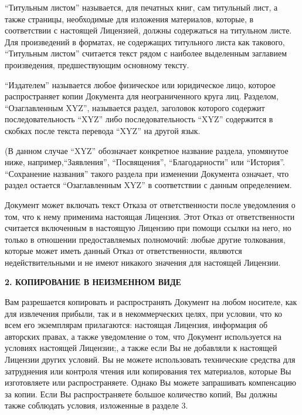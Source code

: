 \enquote{Титульным листом} называется, для печатных книг, сам
титульный лист, а также страницы, необходимые для изложения
материалов, которые, в соответствии с настоящей Лицензией, должны
содержаться на титульном листе. Для произведений в форматах, не
содержащих титульного листа как такового, \enquote{Титульным листом}
считается текст рядом с наиболее выделенным заглавием произведения,
предшествующим основному тексту.

\enquote{Издателем} называется любое физическое или юридическое лицо,
которое распространяет копии Документа для неограниченного круга
лиц. Разделом, \enquote{Озаглавленным XYZ}, называется раздел,
заголовок которого содержит последовательность \enquote{XYZ} либо
последовательность \enquote{XYZ} содержится в скобках после текста
перевода \enquote{XYZ} на другой язык.

(В данном случае \enquote{XYZ} обозначает конкретное название раздела,
упомянутое ниже, например,\enquote{Заявления}, \enquote{Посвящения},
\enquote{Благодарности} или \enquote{История}. \enquote{Сохранение
  названия} такого раздела при изменении Документа означает, что
раздел остается \enquote{Озаглавленным XYZ} в соответствии с данным
определением.

Документ может включать текст Отказа от ответственности после
уведомления о том, что к нему применима настоящая Лицензия. Этот Отказ
от ответственности считается включенным в настоящую Лицензию при
помощи ссылки на него, но только в отношении предоставляемых
полномочий: любые другие толкования, которые может иметь данный Отказ
от ответственности, являются недействительными и не имеют никакого
значения для настоящей Лицензии.


\begin{center}
{\Large\bf 2. КОПИРОВАНИЕ В НЕИЗМЕННОМ ВИДЕ\par}
\end{center}

Вам разрешается копировать и распространять Документ на любом
носителе, как для извлечения прибыли, так и в некоммерческих целях,
при условии, что ко всем его экземплярам прилагаются: настоящая
Лицензия, информация об авторских правах, а также уведомление о том,
что Документ используется на условиях настоящей Лицензии;, а также
если Вы не добавляли к настоящей Лицензии других условий. Вы не можете
использовать технические средства для затруднения или контроля чтения
или копирования тех материалов, которые Вы изготовляете или
распространяете. Однако Вы можете запрашивать компенсацию за
копии. Если Вы распространяете большое количество копий, Вы должны
также соблюдать условия, изложенные в разделе 3.

